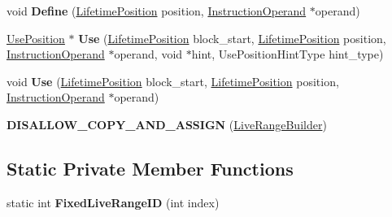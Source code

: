 \begin{DoxyCompactItemize}
\item 
void {\bfseries Define} (\hyperlink{classv8_1_1internal_1_1compiler_1_1_lifetime_position}{Lifetime\+Position} position, \hyperlink{classv8_1_1internal_1_1compiler_1_1_instruction_operand}{Instruction\+Operand} $\ast$operand)\hypertarget{classv8_1_1internal_1_1compiler_1_1_live_range_builder_a7af29411eff1ac8b7a21c246e27356be}{}\label{classv8_1_1internal_1_1compiler_1_1_live_range_builder_a7af29411eff1ac8b7a21c246e27356be}

\item 
\hyperlink{classv8_1_1internal_1_1compiler_1_1_use_position}{Use\+Position} $\ast$ {\bfseries Use} (\hyperlink{classv8_1_1internal_1_1compiler_1_1_lifetime_position}{Lifetime\+Position} block\+\_\+start, \hyperlink{classv8_1_1internal_1_1compiler_1_1_lifetime_position}{Lifetime\+Position} position, \hyperlink{classv8_1_1internal_1_1compiler_1_1_instruction_operand}{Instruction\+Operand} $\ast$operand, void $\ast$hint, Use\+Position\+Hint\+Type hint\+\_\+type)\hypertarget{classv8_1_1internal_1_1compiler_1_1_live_range_builder_afa520bf181e05ba69faa6ba54dc0368d}{}\label{classv8_1_1internal_1_1compiler_1_1_live_range_builder_afa520bf181e05ba69faa6ba54dc0368d}

\item 
void {\bfseries Use} (\hyperlink{classv8_1_1internal_1_1compiler_1_1_lifetime_position}{Lifetime\+Position} block\+\_\+start, \hyperlink{classv8_1_1internal_1_1compiler_1_1_lifetime_position}{Lifetime\+Position} position, \hyperlink{classv8_1_1internal_1_1compiler_1_1_instruction_operand}{Instruction\+Operand} $\ast$operand)\hypertarget{classv8_1_1internal_1_1compiler_1_1_live_range_builder_a2538050f0f6d4abb0a4266ba36a2676c}{}\label{classv8_1_1internal_1_1compiler_1_1_live_range_builder_a2538050f0f6d4abb0a4266ba36a2676c}

\item 
{\bfseries D\+I\+S\+A\+L\+L\+O\+W\+\_\+\+C\+O\+P\+Y\+\_\+\+A\+N\+D\+\_\+\+A\+S\+S\+I\+GN} (\hyperlink{classv8_1_1internal_1_1compiler_1_1_live_range_builder}{Live\+Range\+Builder})\hypertarget{classv8_1_1internal_1_1compiler_1_1_live_range_builder_ab6aa50460e4c6908fc7a3768768520fd}{}\label{classv8_1_1internal_1_1compiler_1_1_live_range_builder_ab6aa50460e4c6908fc7a3768768520fd}

\end{DoxyCompactItemize}
\subsection*{Static Private Member Functions}
\begin{DoxyCompactItemize}
\item 
static int {\bfseries Fixed\+Live\+Range\+ID} (int index)\hypertarget{classv8_1_1internal_1_1compiler_1_1_live_range_builder_a21080e854c012920ae052d448a3dfce4}{}\label{classv8_1_1internal_1_1compiler_1_1_live_range_builder_a21080e854c012920ae052d448a3dfce4}

\end{DoxyCompactItemize}
